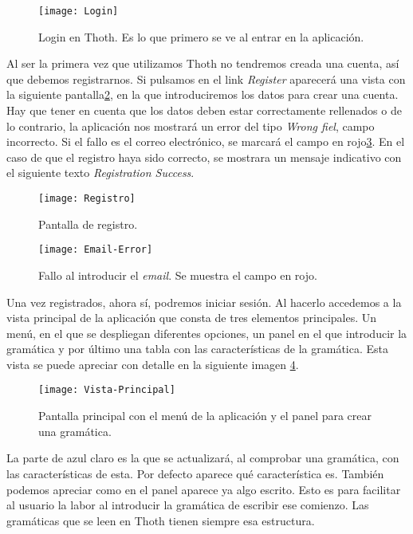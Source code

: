 \begin{figure}[h]
\centering
\texttt{[image: Login]}
\caption{Login en Thoth. Es lo que primero se ve al entrar en la aplicación.}
\label{fig:6.1}
\end{figure}

Al ser la primera vez que utilizamos Thoth no tendremos creada una cuenta, así que debemos registrarnos. Si pulsamos en el link \emph{Register} aparecerá una vista con la siguiente pantalla\ref{fig:6.2}, en la que introduciremos los datos para crear una cuenta. Hay que tener en cuenta que los datos deben estar correctamente rellenados o de lo contrario, la aplicación nos mostrará un error del tipo \emph{Wrong fiel}, campo incorrecto. Si el fallo es el correo electrónico, se marcará el campo en rojo\ref{fig:6.3}. En el caso de que el registro haya sido correcto, se mostrara un mensaje indicativo con el siguiente texto \emph{Registration Success}.

\begin{figure}[h]
\centering
\texttt{[image: Registro]}
\caption{Pantalla de registro.}
\label{fig:6.2}
\end{figure}

\begin{figure}[h]
\centering
\texttt{[image: Email-Error]}
\caption{Fallo al introducir el \emph{email}. Se muestra el campo en rojo.}
\label{fig:6.3}
\end{figure}

Una vez registrados, ahora sí, podremos iniciar sesión. Al hacerlo accedemos a la vista principal de la aplicación que consta de tres elementos principales. Un menú, en el que se despliegan diferentes opciones, un panel en el que introducir la gramática y por último una tabla con las características de la gramática. Esta vista se puede apreciar con detalle en la siguiente imagen \ref{fig:6.4}.


\begin{figure}[h]
\centering
\texttt{[image: Vista-Principal]}
\caption{Pantalla principal con el menú de la aplicación y el panel para crear una gramática.}
\label{fig:6.4}
\end{figure}

La parte de azul claro es la que se actualizará, al comprobar una gramática, con las características de esta. Por defecto aparece qué característica es. También podemos apreciar como en el panel aparece ya algo escrito. Esto es para facilitar al usuario la labor al introducir la gramática de escribir ese comienzo. Las gramáticas que se leen en Thoth tienen siempre esa estructura. 

